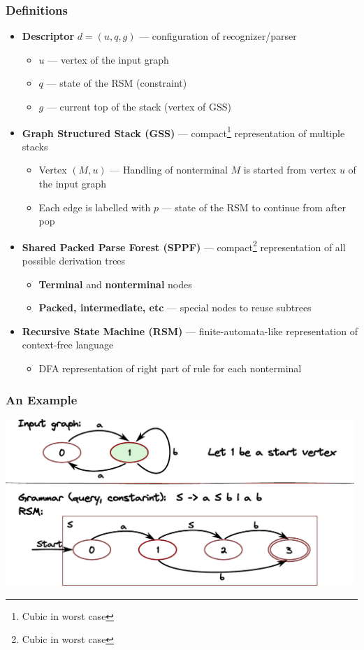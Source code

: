 \documentclass[xcolor=table,aspectratio=169]{beamer}
\begin{document}
\begin{frame}[fragile] \frametitle{Definitions}
  \begin{itemize}
      \item \textbf{Descriptor} $d=(u,q,g)$ --- configuration of recognizer/parser
      \begin{itemize}
        \item $u$ --- vertex of the input graph
        \item $q$ --- state of the RSM (constraint)
        \item $g$ --- current top of the stack (vertex of GSS) 
      \end{itemize}
      \item \textbf{Graph Structured Stack (GSS)} --- compact\footnote{Cubic in worst case} representation of multiple stacks
      \begin{itemize}
        \item Vertex $(M,u)$ --- Handling of nonterminal $M$ is started from vertex $u$ of the input graph
        \item Each edge is labelled with $p$ --- state of the RSM to continue from after pop
      \end{itemize}
      \item \textbf{Shared Packed Parse Forest (SPPF)} --- compact\footnote{Cubic in worst case} representation of all possible derivation trees
      \begin{itemize}
        \item \textbf{Terminal} and \textbf{nonterminal} nodes
        \item \textbf{Packed, intermediate, etc} --- special nodes to reuse subtrees
      \end{itemize}
      \item \textbf{Recursive State Machine (RSM)} --- finite-automata-like representation of context-free language
      \begin{itemize}
        \item DFA representation of right part of rule for each nonterminal
      \end{itemize}
  \end{itemize}

\end{frame}

\begin{frame}[fragile] \frametitle{An Example}
  \begin{center}
      \includegraphics[width=0.99\textwidth]{pictures/RSM.pdf}
  \end{center}
\end{frame}
\end{document}
